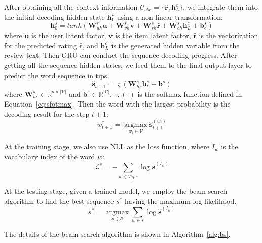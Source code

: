 \documentclass[sigconf]{acmart}
\begin{document}
After obtaining all the context information $\mathcal{C}_{ctx} = \{ \mathbf{\hat r}, \mathbf{h}_L^c\}$, we integrate them into the initial decoding hidden state $\mathbf{h}_{0}^s$ using a non-linear transformation:
\begin{equation}
\mathbf{h}_{0}^s = tanh(\mathbf{W}_{uh}^s\mathbf{u} + \mathbf{W}_{vh}^s\mathbf{v} + \mathbf{W}_{rh}^s\mathbf{\hat r} + \mathbf{W}_{ch}^s\mathbf{h}_L^c + \mathbf{b}_c^s)
\end{equation}
where $\mathbf{u}$ is the user latent factor, $\mathbf{v}$ is the item latent factor, $\mathbf{\hat r}$ is the vectorization for the predicted rating $\hat r$, and $\mathbf{h}_L^c$ is the generated hidden variable from the review text.
Then GRU can conduct the sequence decoding progress. After getting all the sequence hidden states, we feed them to the final output layer to predict the word sequence in tips.
\begin{equation}
\mathbf{\hat s}_{t+1} = \varsigma (\mathbf{W}_{hs}^s\mathbf{h}_t^s  + \mathbf{b}^s)
\end{equation}
where $\mathbf{W}_{hs}^s \in \mathbb{R}^{d \times |\mathcal{V}|}$ and $\mathbf{b}^s \in \mathbb{R}^{|\mathcal{V}|}$. $\varsigma(\cdot)$ is the softmax function defined in Equation~\ref{eq:sfotmax}. Then the word with the largest probability is the decoding result for the step $t+1$:
\begin{equation}
{w_{t + 1}^*} = \mathop {\arg\max }\limits_{{w_i} \in \mathcal{V}} \mathbf{\hat s}_{t + 1}^{ (w_i) }
\end{equation}

At the training stage, we also use NLL as the loss function, where $I_w$ is the vocabulary index of the  word $w$:
\begin{equation}
{\mathcal{L}^s} =  - \sum\limits_{w \in Tips} {\log {\mathbf{\hat s}^{(I_w)}}}
\label{eq:losss}
\end{equation}

At the testing stage, given a trained model, we employ the beam search algorithm to find the best sequence $s^*$ having the maximum log-likelihood.
\begin{equation}
{s^*} = \mathop {\arg \max }\limits_{s \in \mathcal{S}} \sum\limits_{w \in s} {\log {\mathbf{\hat s}^{(I_w)}}}
\end{equation}

The details of the beam search algorithm is shown in Algorithm~\ref{alg:bs}.
\end{document}
